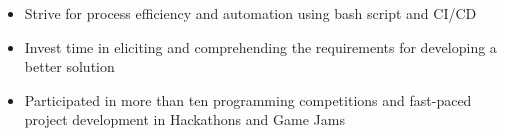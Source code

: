 \bigskip
\medskip



\begin{itemize}
    \item[\color{midaccent}\faAngleRight] Strive for process efficiency and automation using bash script and CI/CD
    \item[\color{midaccent}\faAngleRight] Invest time in eliciting and comprehending the requirements for developing a better solution
	\item[\color{midaccent}\faAngleRight] Participated in more than ten programming competitions and fast-paced project development in Hackathons and Game Jams \par
\end{itemize}


